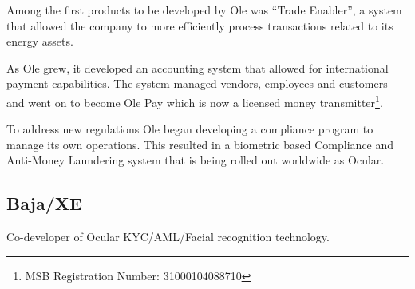 \documentclass[a4paper]{article}
\begin{document}
Among the first products to be developed by Ole was “Trade Enabler”, a system that allowed the company to more efficiently process transactions related to its energy assets.

As Ole grew, it developed an accounting system that allowed for international payment capabilities. The system managed vendors, employees and customers and went on to become Ole Pay which is now a licensed money transmitter\footnote{MSB Registration Number: 31000104088710}. 

To address new regulations Ole began developing a compliance program to manage its own operations. This resulted in a biometric based Compliance and Anti-Money Laundering system that is being rolled out worldwide as Ocular.

\subsection{Baja/XE}

Co-developer of Ocular KYC/AML/Facial recognition technology.   
\end{document}

